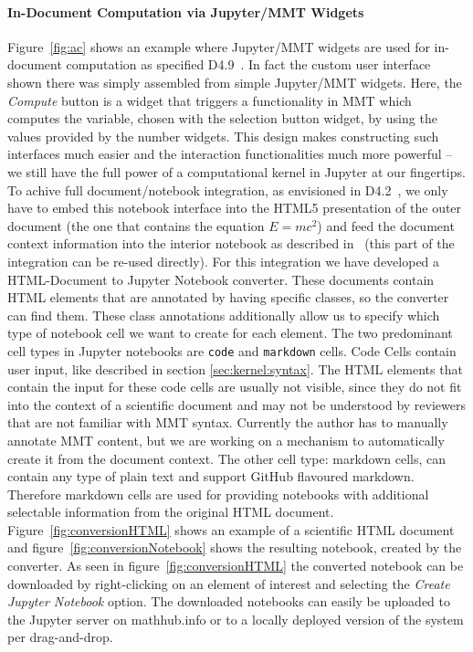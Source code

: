 \paragraph{In-Document Computation via Jupyter/MMT Widgets}
Figure~\ref{fig:ac} shows an example where Jupyter/MMT widgets are used for in-document computation as specified D4.9~\cite{ODK-D4.9}.
In fact the custom user interface shown there was simply assembled from simple Jupyter/MMT widgets. Here, the \textit{Compute} button is a widget that triggers a functionality in MMT which computes the variable, chosen with the selection button widget, by using the values provided by the number widgets.
This design makes constructing such interfaces much easier and the interaction functionalities much more powerful -- we still have the full power of a computational kernel in Jupyter at our fingertips. 
To achive full document/notebook integration, as envisioned in D4.2~\cite{ODK-D4.2}, we only have to embed this notebook interface into the HTML5 presentation of the outer document (the one that contains the equation $E=mc^2$) and feed the document context information into the interior notebook as described in~\cite{ODK-D4.9} (this part of the integration can be re-used directly).
For this integration we have developed a HTML-Document to Jupyter Notebook converter. These documents contain HTML elements that are annotated by having specific classes, so the converter can find them. 
These class annotations additionally allow us to specify which type of notebook cell we want to create for each element. 
The two predominant cell types in Jupyter notebooks are \texttt{code} and \texttt{markdown} cells. 
Code Cells contain user input, like described in section \ref{sec:kernel:syntax}. The HTML elements that contain the input for these code cells are usually not visible, since they do not fit into the context of a scientific document and may not be understood by reviewers that are not familiar with MMT syntax. 
Currently the author has to manually annotate MMT content, but we are working on a mechanism to automatically create it from the document context. The other cell type: markdown cells, can contain any type of plain text and support GitHub flavoured markdown. 
Therefore markdown cells are used for providing notebooks with additional selectable information from the original HTML document. Figure~\ref{fig:conversionHTML} shows an example of a scientific HTML document and  figure~\ref{fig:conversionNotebook} shows the resulting notebook, created by the converter. As seen in figure~\ref{fig:conversionHTML} the converted notebook can be downloaded by right-clicking on an element of interest and selecting the \textit{Create Jupyter Notebook} option. The downloaded notebooks can easily be uploaded to the Jupyter server on mathhub.info or to a locally deployed version of the system per drag-and-drop. 

